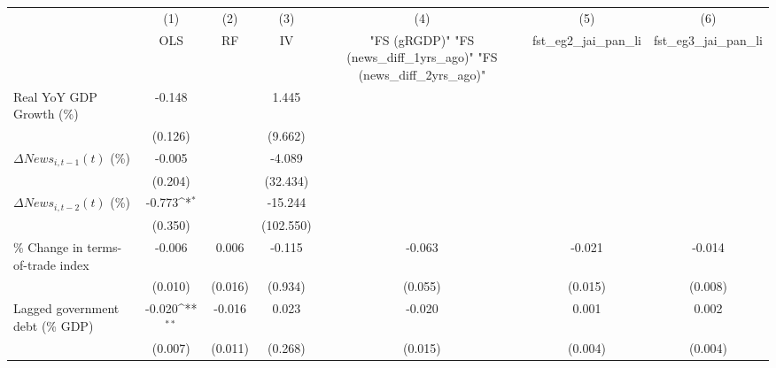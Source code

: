 {
\def\sym#1{\ifmmode^{#1}\else\(^{#1}\)\fi}
\begin{tabular}{l*{6}{c}}
\toprule
                    &\multicolumn{1}{c}{(1)}&\multicolumn{1}{c}{(2)}&\multicolumn{1}{c}{(3)}&\multicolumn{1}{c}{(4)}&\multicolumn{1}{c}{(5)}&\multicolumn{1}{c}{(6)}\\
                    &\multicolumn{1}{c}{OLS}&\multicolumn{1}{c}{RF}&\multicolumn{1}{c}{IV}&\multicolumn{1}{c}{ "FS (gRGDP)"  "FS (news_diff_1yrs_ago)"  "FS (news_diff_2yrs_ago)" }&\multicolumn{1}{c}{fst_eg2_jai_pan_li}&\multicolumn{1}{c}{fst_eg3_jai_pan_li}\\
\midrule
Real YoY GDP Growth (\%)&      -0.148         &                     &       1.445         &                     &                     &                     \\
                    &     (0.126)         &                     &     (9.662)         &                     &                     &                     \\
\addlinespace
$ \Delta News_{i,t-1}(t)$ (\%)&      -0.005         &                     &      -4.089         &                     &                     &                     \\
                    &     (0.204)         &                     &    (32.434)         &                     &                     &                     \\
\addlinespace
$ \Delta News_{i,t-2}(t)$ (\%)&      -0.773\sym{*}  &                     &     -15.244         &                     &                     &                     \\
                    &     (0.350)         &                     &   (102.550)         &                     &                     &                     \\
\addlinespace
\% Change in terms-of-trade index&      -0.006         &       0.006         &      -0.115         &      -0.063         &      -0.021         &      -0.014         \\
                    &     (0.010)         &     (0.016)         &     (0.934)         &     (0.055)         &     (0.015)         &     (0.008)         \\
\addlinespace
Lagged government debt (\% GDP)&      -0.020\sym{**} &      -0.016         &       0.023         &      -0.020         &       0.001         &       0.002         \\
                    &     (0.007)         &     (0.011)         &     (0.268)         &     (0.015)         &     (0.004)         &     (0.004)         \\

\end{tabular}}
